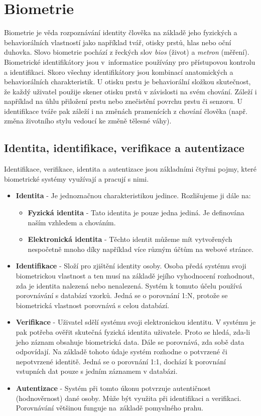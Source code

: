 \chapter{Biometrie} 
Biometrie je věda rozpoznávání identity člověka na základě jeho fyzických a behaviorálních vlastností jako například tvář, otisky prstů, hlas nebo oční duhovka. \cite{Jain2008} Slovo biometrie pochází z řeckých slov \textit{bios} (život) a \textit{metron} (měření). Biometrické identifikátory jsou v~informatice používány pro přístupovou kontrolu a identifikaci. Skoro všechny identifikátory jsou kombinací anatomických a behaviorálních charakteristik. U otisku prstu je behaviorální složkou skutečnost, že každý uživatel použije skener otisku prstů v závislosti na svém chování. Záleží i například na úhlu přiložení prstu nebo znečistění povrchu prstu či senzoru. U identifikace tváře pak záleží i na změnách pramenících z chování člověka (např. změna životního stylu vedoucí ke změně tělesné váhy). \cite{Maltoni2009}

\section{Identita, identifikace, verifikace a autentizace}
Identifikace, verifikace, identita a autentizace jsou základními čtyřmi pojmy, které biometrické systémy využívají a pracují s nimi. \cite{Drahansky}
\begin{itemize}
    \item \textbf{Identita} - Je jednoznačnou charakteristikou jedince. Rozlišujeme ji dále na:
        \begin{itemize}
            \item \textbf{Fyzická identita} - Tato identita je pouze jedna jediná. Je definována naším vzhledem a chováním.
            \item \textbf{Elektronická identita} - Těchto identit můžeme mít vytvořených nespočetně mnoho díky například více různým účtům na webové stránce.
        \end{itemize}
    \item \textbf{Identifikace} - Složí pro zjištění identity osoby. Osoba předá systému svoji biometrickou vlastnost a ten musí na základě jejího vyhodnocení rozhodnout, zda je identita nalezená nebo nenalezená. Systém k tomuto účelu používá porovnávání s databází vzorků. Jedná se o porovnání 1:N, protože se biometrická vlastnost porovnává s celou databází.
    \item \textbf{Verifikace} - Uživatel sdělí systému svoji elektronickou identitu. V systému je pak potřeba ověřit skutečná fyzická identita uživatele. Proto se hledá, zda-li jeho záznam obsahuje biometrická data. Dále se porovnává, zda sobě data odpovídají. Na základě tohoto údaje systém rozhodne o potvrzené či nepotvrzené identitě. Jedná se o porovnání 1:1, dochází k porovnání vstupních dat pouze s jedním záznamem v databázi.
    \item \textbf{Autentizace} - Systém při tomto úkonu potvrzuje autentičnost (hodnověrnost) dané osoby. Může být využita při identifikaci a verifikaci. Porovnávání většinou funguje na~základě pomyslného prahu.
\end{itemize}

